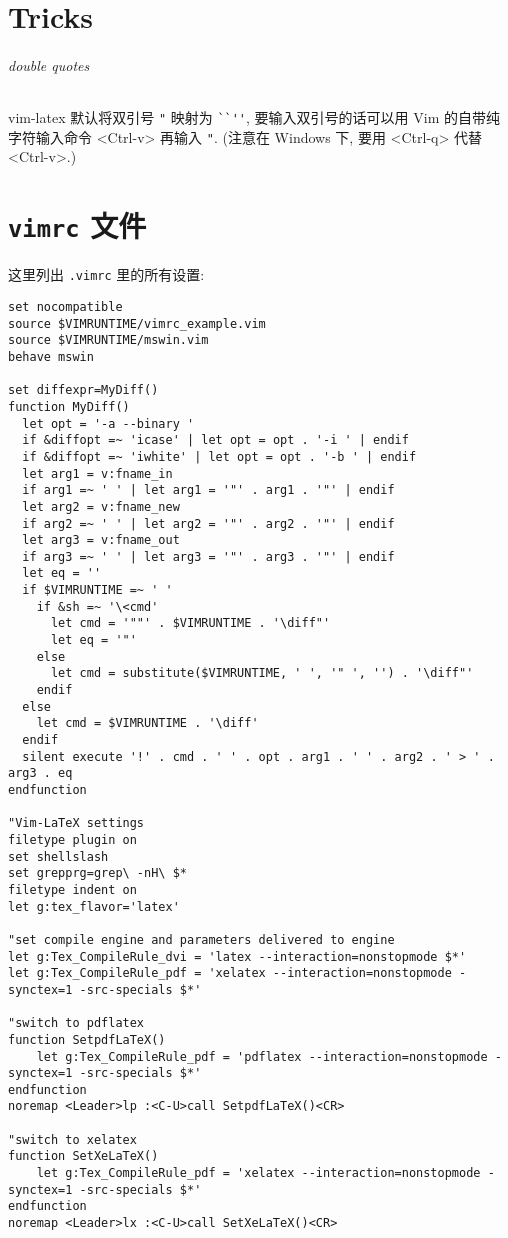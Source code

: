 \documentclass{article}
\begin{document}
\part{Tricks}
\paragraph{double quotes}
vim-latex 默认将双引号 \verb|"| 映射为 \verb|``''|, 要输入双引号的话可以用 Vim 的自带纯字符输入命令 <Ctrl-v> 再输入 \verb|"|. (注意在 Windows 下, 要用 <Ctrl-q> 代替 <Ctrl-v>.)

\part{\texttt{vimrc} 文件}
这里列出 \verb|.vimrc| 里的所有设置:
{\tiny
\begin{verbatim}
set nocompatible
source $VIMRUNTIME/vimrc_example.vim
source $VIMRUNTIME/mswin.vim
behave mswin

set diffexpr=MyDiff()
function MyDiff()
  let opt = '-a --binary '
  if &diffopt =~ 'icase' | let opt = opt . '-i ' | endif
  if &diffopt =~ 'iwhite' | let opt = opt . '-b ' | endif
  let arg1 = v:fname_in
  if arg1 =~ ' ' | let arg1 = '"' . arg1 . '"' | endif
  let arg2 = v:fname_new
  if arg2 =~ ' ' | let arg2 = '"' . arg2 . '"' | endif
  let arg3 = v:fname_out
  if arg3 =~ ' ' | let arg3 = '"' . arg3 . '"' | endif
  let eq = ''
  if $VIMRUNTIME =~ ' '
    if &sh =~ '\<cmd'
      let cmd = '""' . $VIMRUNTIME . '\diff"'
      let eq = '"'
    else
      let cmd = substitute($VIMRUNTIME, ' ', '" ', '') . '\diff"'
    endif
  else
    let cmd = $VIMRUNTIME . '\diff'
  endif
  silent execute '!' . cmd . ' ' . opt . arg1 . ' ' . arg2 . ' > ' . arg3 . eq
endfunction

"Vim-LaTeX settings
filetype plugin on
set shellslash
set grepprg=grep\ -nH\ $*
filetype indent on
let g:tex_flavor='latex'

"set compile engine and parameters delivered to engine
let g:Tex_CompileRule_dvi = 'latex --interaction=nonstopmode $*'
let g:Tex_CompileRule_pdf = 'xelatex --interaction=nonstopmode -synctex=1 -src-specials $*'

"switch to pdflatex
function SetpdfLaTeX()
	let g:Tex_CompileRule_pdf = 'pdflatex --interaction=nonstopmode -synctex=1 -src-specials $*'
endfunction
noremap <Leader>lp :<C-U>call SetpdfLaTeX()<CR>

"switch to xelatex
function SetXeLaTeX()
	let g:Tex_CompileRule_pdf = 'xelatex --interaction=nonstopmode -synctex=1 -src-specials $*'
endfunction
noremap <Leader>lx :<C-U>call SetXeLaTeX()<CR>


\end{verbatim}}
\end{document}
